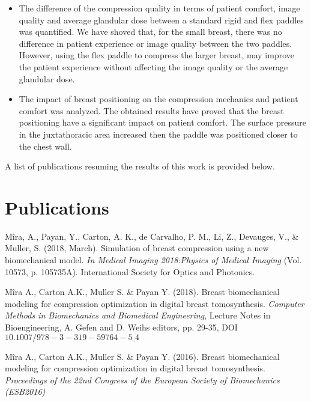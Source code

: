 \begin{itemize}
\item The difference of the compression quality in terms of patient comfort, image quality and average glandular dose between a standard rigid and flex paddles was quantified. We have shoved that, for the small breast, there was no difference in patient experience or image quality between the two paddles. However, using the flex paddle to compress the larger breast, may improve the patient experience without affecting the image quality or the average glandular dose.
\item The impact of breast positioning on the compression mechanics and patient comfort was analyzed. The obtained results have proved that the breast positioning have a significant impact on patient comfort. The surface pressure in the juxtathoracic area increased then the paddle was positioned closer to the chest wall.
\end{itemize}
A list of publications resuming the results of this work is provided below.
\cleardoublepage
 
\chapter*{Publications}\label{section:publications}

\begin{description}

\item  Mîra, A., Payan, Y., Carton, A. K., de Carvalho, P. M., Li, Z., Devauges, V., \& Muller, S. (2018, March). Simulation of breast compression using a new biomechanical model. \textit {In Medical Imaging 2018:Physics of Medical Imaging} (Vol. 10573, p. 105735A). International Society for Optics and Photonics. \\

\item  Mîra A., Carton A.K., Muller S. \& Payan Y. (2018). Breast biomechanical modeling for compression optimization in digital breast tomosynthesis. \textit{Computer Methods in Biomechanics and Biomedical Engineering}, Lecture Notes in Bioengineering, A. Gefen and D. Weihs editors, pp. 29-35, DOI $10.1007/978-3-319-59764-5\_4$ \\

\item  Mîra A., Carton A.K., Muller S. \& Payan Y. (2016). Breast biomechanical modeling for compression optimization in digital breast tomosynthesis. \textit{Proceedings of the 22nd Congress of the European Society of Biomechanics (ESB2016)}
\end{description}

\cleardoublepage